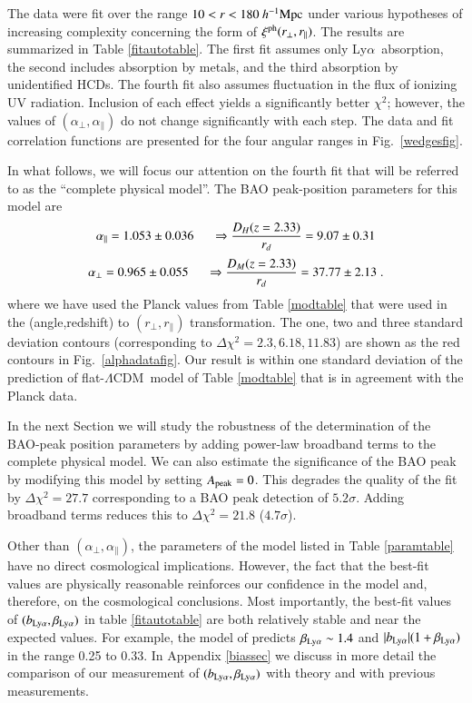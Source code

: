 \documentclass{aa}
\newcommand{\xicosmo}{\xi^{\rm ph}}
\newcommand{\apar}{\alpha_\parallel}
\newcommand{\aperp}{\alpha_\perp}
\newcommand{\hMpc}{h^{-1}{\rm Mpc}}
\newcommand{\Lya}{Ly$\alpha$~}
\newcommand{\DM}{D_M}
\newcommand{\DHub}{D_H}
\newcommand{\rperp}{r_\perp}
\newcommand{\rpar}{r_\parallel}
\newcommand{\lcdm}{$\Lambda$CDM~}
\newcommand{\betalya}{\beta_{\rm Ly\alpha}}
\newcommand{\blya}{b_{\rm Ly\alpha}}
\newcommand{\Apeak}{A_{\rm peak}}
\begin{document}
The data were fit over the range
$10<r<180~\hMpc$
under various hypotheses of increasing complexity
concerning the form of $\xicosmo(\rperp,\rpar)$.
The results are summarized in 
Table \ref{fitautotable}.
The first fit assumes only \Lya absorption, the second
includes absorption by metals, and the third absorption
by unidentified HCDs.
The fourth fit also assumes fluctuation in the flux of
ionizing UV radiation.
Inclusion of each effect yields a significantly better
$\chi^2$;  however, the  values of $(\aperp,\apar)$ do
not change significantly with each step.
The data and fit correlation functions  are presented
for the four angular ranges in Fig.~\ref{wedgesfig}.


  In what follows, we will focus our attention on the fourth
  fit that will be referred to as the ``complete physical model''.
The BAO peak-position parameters for this model are
\begin{equation}
 \apar= 1.053  \pm  0.036  \hspace*{5mm}\Rightarrow \frac{\DHub(z=2.33)}{r_d}= 9.07  \pm  0.31
\label{aparresult}
\end{equation}
\begin{equation}
 \aperp= 0.965  \pm  0.055  \hspace*{5mm}\Rightarrow \frac{\DM(z=2.33)}{r_d}= 37.77  \pm  2.13
\; .
\label{aperpresult}
\end{equation}
where we have used the Planck values from Table \ref{modtable}
that were used in the (angle,redshift) to $(\rperp,\rpar)$ transformation.
The one, two and three standard deviation contours
(corresponding to $\Delta\chi^2=2.3,6.18,11.83$)
are shown as the red contours
in Fig.~\ref{alphadatafig}.
Our result is within one standard deviation of the prediction
of flat-\lcdm model of Table \ref{modtable} that is
in agreement with the Planck data.

  In the next Section we will study the robustness of the determination
  of the BAO-peak position parameters by
  adding power-law broadband terms to the complete physical model.
  We can also estimate
the significance of the BAO peak by modifying this  model by
 setting $\Apeak=0$.
 This degrades the quality of the fit by $\Delta\chi^2=27.7$ corresponding
 to a BAO peak detection of $5.2\sigma$.  Adding broadband terms reduces
 this to $\Delta\chi^2=21.8$ ($4.7\sigma$).



Other than $(\aperp,\apar)$, the  parameters of the model listed in
Table \ref{paramtable} have no direct cosmological implications.
However, the fact that
the best-fit values are physically reasonable
reinforces our confidence in the model and, therefore, 
on the cosmological conclusions.
Most importantly,
the best-fit values of $(\blya,\betalya)$ in table \ref{fitautotable}
are both relatively stable and near the expected values.
For example, the model of \citet{2015JCAP...12..017A}
predicts $\betalya\sim1.4$ and $|\blya|(1+\betalya)$ in the
range 0.25 to 0.33.
In Appendix \ref{biassec} we discuss in more detail the comparison
of our measurement of $(\blya,\betalya)$ with theory and
with previous measurements.
\end{document}
